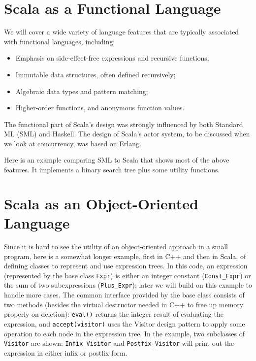 \documentclass[11pt]{article}
\begin{document}
\section{Scala as a Functional Language}
We will cover a wide variety of language features that are typically
associated with functional languages, including:
\begin{itemize}
\item Emphasis on side-effect-free expressions and recursive functions;
\item Immutable data structures, often defined recursively;
\item Algebraic data types and pattern matching;
\item Higher-order functions, and anonymous function values.
\end{itemize}
The functional part of Scala's design was strongly influenced by
both Standard ML (SML) and Haskell. The design of Scala's actor
system, to be discussed when we look at concurrency, was based on
Erlang.

Here is an example comparing SML to Scala that shows most of the
above features. It implements a binary search tree plus some utility
functions.


\section{Scala as an Object-Oriented Language}

Since it is hard to see the utility of an object-oriented approach
in a small program, here is a somewhat longer example, first in C++
and then in Scala, of defining classes to represent and use expression
trees. In this code, an expression (represented by the base class
\verb|Expr|) is either an integer constant (\verb|Const_Expr|) or
the sum of two subexpressions (\verb|Plus_Expr|); later we will
build on this example to handle more cases. The common interface
provided by the base class consists of two methods (besides the
virtual destructor needed in C++ to free up memory properly on
deletion): \verb|eval()| returns the integer result of evaluating
the expression, and \verb|accept(visitor)| uses the Visitor design
pattern to apply some operation to each node in the expression tree.
In the example, two subclasses of \verb|Visitor| are shown:
\verb|Infix_Visitor| and \verb|Postfix_Visitor| will print out the
expression in either infix or postfix form.
\end{document}
